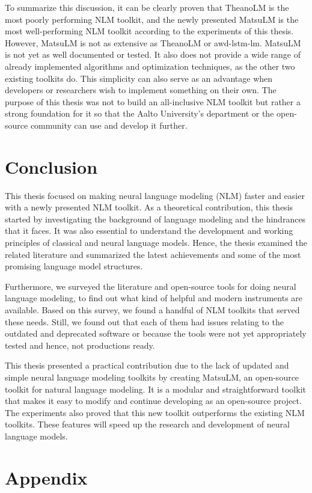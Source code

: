 To summarize this discussion, it can be clearly proven that TheanoLM is the most poorly performing NLM toolkit, and the newly presented MatsuLM is the most well-performing NLM toolkit according to the experiments of this thesis. However, MatsuLM is not as extensive as TheanoLM or awd-lstm-lm. MatsuLM is not yet as well documented or tested. It also does not provide a wide range of already implemented algorithms and optimization techniques, as the other two existing toolkits do. This simplicity can also serve as an advantage when developers or researchers wish to implement something on their own. The purpose of this thesis was not to build an all-inclusive NLM toolkit but rather a strong foundation for it so that the Aalto University's department or the open-source community can use and develop it further.

\chapter{Conclusion}

This thesis focused on making neural language modeling (NLM) faster and easier with a newly presented NLM toolkit. As a theoretical contribution, this thesis started by investigating the background of language modeling and the hindrances that it faces. It was also essential to understand the development and working principles of classical and neural language models. Hence, the thesis examined the related literature and summarized the latest achievements and some of the most promising language model structures.

Furthermore, we surveyed the literature and open-source tools for doing neural language modeling, to find out what kind of helpful and modern instruments are available. Based on this survey, we found a handful of NLM toolkits that served these needs. Still, we found out that each of them had issues relating to the outdated and deprecated software or because the tools were not yet appropriately tested and hence, not productions ready.

This thesis presented a practical contribution due to the lack of updated and simple neural language modeling toolkits by creating MatsuLM, an open-source toolkit for natural language modeling. It is a modular and straightforward toolkit that makes it easy to modify and continue developing as an open-source project. The experiments also proved that this new toolkit outperforms the existing NLM toolkits. These features will speed up the research and development of neural language models.

\appendix

\chapter{Appendix}

\pagebreak
\printbibliography


